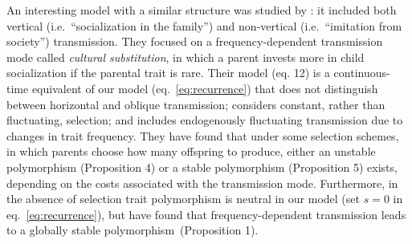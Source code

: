 \documentclass[14pt]{extarticle}
\begin{document}
An interesting model with a similar structure was studied by \citet{Bisin2001}: it included both vertical (i.e.~``socialization in the family'') and non-vertical (i.e.~``imitation from society'') transmission.
They focused on a frequency-dependent transmission mode called \emph{cultural substitution}, in which a parent invests more in child socialization if the parental trait is rare.
Their model (eq. 12) is a continuous-time equivalent of our model (eq.~\ref{eq:recurrence}) that does not distinguish between horizontal and oblique transmission; considers constant, rather than fluctuating, selection; and includes endogenously fluctuating transmission due to changes in trait frequency.
They have found that under some selection schemes, in which parents choose how many offspring to produce, either an unstable polymorphism (Proposition 4) or a stable polymorphism (Proposition 5) exists, depending on the costs associated with the transmission mode.
Furthermore, in the absence of selection trait polymorphism is neutral in our model (set $s=0$ in eq.~\ref{eq:recurrence}), but \citet{Bisin2001} have found that frequency-dependent transmission leads to a globally stable polymorphism~(Proposition 1).
\end{document}
